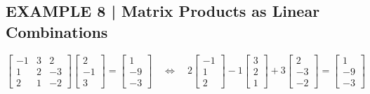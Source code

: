 \documentclass{article}
\theoremstyle{mystyle}
\begin{document}
\subsection*{EXAMPLE 8 | Matrix Products as Linear Combinations}
\[
\begin{bmatrix}-1&3&2\\1&2&-3\\2&1&-2\end{bmatrix}\begin{bmatrix}2\\-1\\3\end{bmatrix}=\begin{bmatrix}1\\-9\\-3\end{bmatrix}
\quad\Longleftrightarrow\quad
2\begin{bmatrix}-1\\1\\2\end{bmatrix}-1\begin{bmatrix}3\\2\\1\end{bmatrix}+3\begin{bmatrix}2\\-3\\-2\end{bmatrix}=\begin{bmatrix}1\\-9\\-3\end{bmatrix}
\]
\end{document}
